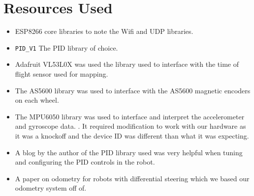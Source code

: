 \documentclass[12pt]{article}
\begin{document}
\section{Resources Used}
\begin{itemize}
	\item ESP8266 core libraries to note the Wifi and UDP libraries. \cite{wifi_lib}
	\item \texttt{PID\_V1} The PID library of choice. \cite{pid_lib}
	\item Adafruit VL53L0X was used the library used to interface with the time of flight sensor used for mapping. \cite{dist_lib}
	\item The AS5600 library was used to interface with the AS5600 magnetic encoders on each wheel. \cite{enc_lib}
	\item The MPU6050 library was used to interface and interpret the accelerometer and gyroscope data. \cite{gyro_lib}. It required modification to work with our hardware as it was a knockoff and the device ID was different than what it was expecting.
	\item A blog by the author of the PID library used was very helpful when tuning and configuring the PID controls in the robot. \cite{pid_help}
	\item A paper on odometry for robots with differential steering which we based our odometry system off of. \cite{odom_help}
\end{itemize}


\nocite{*}


\end{document}
